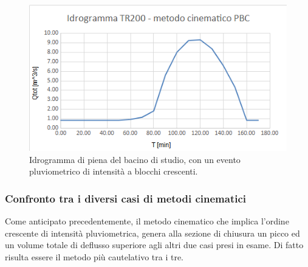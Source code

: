 \begin{figure}[H]  \centering
    \includegraphics[scale=0.8]{immagini/metodo_cinematico_p_b_crescenti.png}
    \caption{Idrogramma di piena del bacino di studio, con un evento pluviometrico di intensità a blocchi crescenti.}
    \label{metodo_cinematico_p_b_crescenti}
\end{figure}    

\subsubsection{Confronto tra i diversi casi di metodi cinematici}
Come anticipato precedentemente, il metodo cinematico che implica l'ordine crescente di intensità pluviometrica, genera alla sezione di chiusura un picco ed un volume totale di deflusso superiore agli altri due casi presi in esame. Di fatto risulta essere il metodo più cautelativo tra i tre.